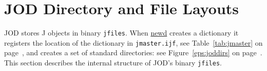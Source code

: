    
   \section{JOD Directory and File Layouts}\label{ss:joddirs}
   
   JOD stores J objects in binary \texttt{jfiles}.  
   When \hyperlink{il:newd}{newd}
    creates a dictionary it registers the location of the dictionary
    in \verb|jmaster.ijf|, see Table~\ref{tab:jmaster} on page~\pageref{tab:jmaster}, 
    and creates a set of standard directories: see 
    Figure~\ref{eps:joddirs} on page~\pageref{eps:joddirs}.
   This section describes the internal structure of JOD's binary \texttt{jfiles}.
    


